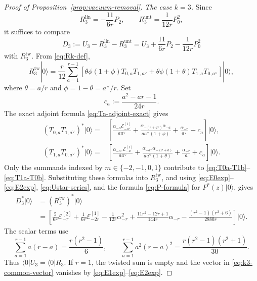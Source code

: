 \documentclass[letterpaper,12pt]{amsart}
\theoremstyle{definition}
\newcommand{\Ecal}{\mathcal E}
\newcommand{\vac}{|0\rangle}
\numberwithin{equation}{section}
\begin{document}
\begin{proof}[Proof of Proposition~\ref{prop:vacuum-removal}]
\smallskip
\noindent\emph{The case \(k=3\).}
Since
\[
  R_3^{\mathrm{lin}}
  =
  -\frac{11}{6r}P_2,
  \qquad
  R_3^{\mathrm{unt}}
  =
  \frac1{12r}P_0^2,
\]
it suffices to compare
\[
  D_3
  :=
  U_3-R_3^{\mathrm{lin}}-R_3^{\mathrm{unt}}
  =
  U_3+\frac{11}{6r}P_2-\frac1{12r}P_0^2
\]
with \(R_3^{\mathrm{tw}}\).  From \eqref{eq:Rk-def},
\[
  R_3^{\mathrm{tw}}\vac
  =
  \frac r{12}\sum_{a=1}^{r-1}
  \left[
    \theta\phi(1+\phi)T_{0,a}T_{1,a^\vee}
    +
    \theta\phi(1+\theta)T_{1,a}T_{0,a^\vee}
  \right]\vac,
\]
where \(\theta=a/r\) and \(\phi=1-\theta=a^\vee/r\).
Set
\[
  c_a:=\frac{a^2-ar-1}{24r}.
\]
The exact adjoint formula \eqref{eq:Ta-adjoint-exact} gives
\begin{align}
  (T_{0,a}T_{1,a^\vee})^*\vac
  ={}&
  \left[
    \frac{\alpha_{-a}\Ecal_{-a^\vee}^{[1]}}{aa^\vee}
    +
    \frac{\alpha_{-(r+a^\vee)}\alpha_{-a}}
         {aa^\vee(1+\phi)}
    +
    \frac{\alpha_{-r}}{a^\vee}
    +
    c_a
  \right]\vac,
  \label{eq:T0a-T1b}\\
  (T_{1,a}T_{0,a^\vee})^*\vac
  ={}&
  \left[
    \frac{\alpha_{-a^\vee}\Ecal_{-a}^{[1]}}{aa^\vee}
    +
    \frac{\alpha_{-a^\vee}\alpha_{-(r+a)}}
         {aa^\vee(1+\theta)}
    +
    \frac{\alpha_{-r}}a
    +
    c_a
  \right]\vac.
  \label{eq:T1a-T0b}
\end{align}
Only the summands indexed by \(m\in\{-2,-1,0,1\}\) contribute to
\eqref{eq:T0a-T1b}--\eqref{eq:T1a-T0b}.  Substituting these formulas into
\(R_3^{\mathrm{tw}}\), and using
\eqref{eq:E0exp}--\eqref{eq:E2exp}, \eqref{eq:Ustar-series}, and the
formula \eqref{eq:P-formula} for \(P^*(z)\vac\), gives
\begin{equation}\label{eq:k3-common-vector}
\begin{aligned}
  D_3^*\vac
  &=
  (R_3^{\mathrm{tw}})^*\vac\\
  &=
  \left[
    \frac5{6r}\Ecal_{-r}^{[2]}
    +\frac1{6r}\Ecal_{-2r}^{[1]}
    -\frac1{12r}\alpha_{-r}^2
    +\frac{11r^2-12r+1}{144r}\alpha_{-r}
    -\frac{(r^2-1)(r^2+6)}{2880r}
  \right]\vac.
\end{aligned}
\end{equation}
The scalar terms use
\[
  \sum_{a=1}^{r-1}a(r-a)
  =
  \frac{r(r^2-1)}6,
  \qquad
  \sum_{a=1}^{r-1}a^2(r-a)^2
  =
  \frac{r(r^2-1)(r^2+1)}{30}.
\]
Thus \(\langle0|U_3=\langle0|R_3\).  If \(r=1\), the twisted sum is
empty and the vector in \eqref{eq:k3-common-vector} vanishes by
\eqref{eq:E1exp}--\eqref{eq:E2exp}.


\end{proof}
\end{document}
